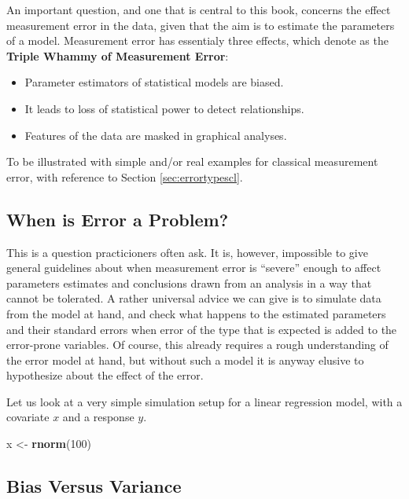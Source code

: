 \documentclass[]{book}
\newenvironment{Shaded}{\begin{snugshade}}{\end{snugshade}}
\newcommand{\KeywordTok}[1]{\textcolor[rgb]{0.13,0.29,0.53}{\textbf{#1}}}
\newcommand{\DecValTok}[1]{\textcolor[rgb]{0.00,0.00,0.81}{#1}}
\newcommand{\StringTok}[1]{\textcolor[rgb]{0.31,0.60,0.02}{#1}}
\newcommand{\NormalTok}[1]{#1}
\providecommand{\tightlist}{%
  \setlength{\itemsep}{0pt}\setlength{\parskip}{0pt}}
\theoremstyle{definition}
\theoremstyle{definition}
\theoremstyle{definition}
\theoremstyle{remark}
\begin{document}
An important question, and one that is central to this book, concerns
the effect measurement error in the data, given that the aim is to
estimate the parameters of a model. Measurement error has essentialy
three effects, which \citet{carroll.etal2006} denote as the
\textbf{Triple Whammy of Measurement Error}:

\begin{itemize}
\tightlist
\item
  Parameter estimators of statistical models are biased.
\item
  It leads to loss of statistical power to detect relationships.
\item
  Features of the data are masked in graphical analyses.
\end{itemize}

To be illustrated with simple and/or real examples for classical
measurement error, with reference to Section \ref{sec:errortypescl}.

\subsection{When is Error a Problem?}\label{when-is-error-a-problem}

This is a question practicioners often ask. It is, however, impossible
to give general guidelines about when measurement error is ``severe''
enough to affect parameters estimates and conclusions drawn from an
analysis in a way that cannot be tolerated. A rather universal advice we
can give is to simulate data from the model at hand, and check what
happens to the estimated parameters and their standard errors when error
of the type that is expected is added to the error-prone variables. Of
course, this already requires a rough understanding of the error model
at hand, but without such a model it is anyway elusive to hypothesize
about the effect of the error.

Let us look at a very simple simulation setup for a linear regression
model, with a covariate \(x\) and a response \(y\).

\begin{Shaded}
\begin{Highlighting}[]
\NormalTok{x <-}\StringTok{ }\KeywordTok{rnorm}\NormalTok{(}\DecValTok{100}\NormalTok{)}
\end{Highlighting}
\end{Shaded}

\subsection{Bias Versus Variance}\label{bias-versus-variance}
\end{document}
